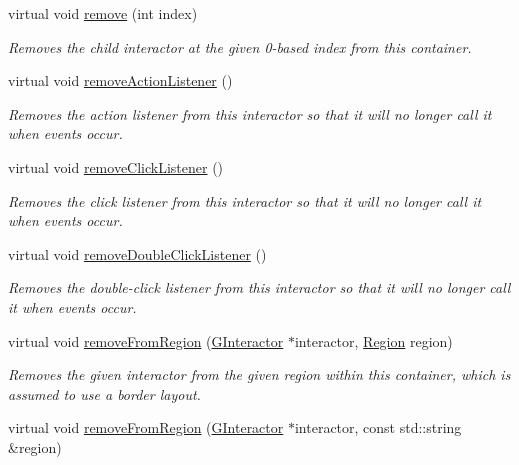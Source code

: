 \begin{DoxyCompactItemize}
virtual void \mbox{\hyperlink{classsgl_1_1GContainer_a2ad1aa316f278b2e9fa8121504749652}{remove}} (int index)
\begin{DoxyCompactList}\small\item\em Removes the child interactor at the given 0-\/based index from this container. \end{DoxyCompactList}\item 
virtual void \mbox{\hyperlink{classsgl_1_1GInteractor_ab7fe7a876367b87cf7202f947f1d05e4}{remove\+Action\+Listener}} ()
\begin{DoxyCompactList}\small\item\em Removes the action listener from this interactor so that it will no longer call it when events occur. \end{DoxyCompactList}\item 
virtual void \mbox{\hyperlink{classsgl_1_1GInteractor_ad39d0325cde6b97ebda4b9d7787c633b}{remove\+Click\+Listener}} ()
\begin{DoxyCompactList}\small\item\em Removes the click listener from this interactor so that it will no longer call it when events occur. \end{DoxyCompactList}\item 
virtual void \mbox{\hyperlink{classsgl_1_1GInteractor_aa4250907e4cdd77349c04f0cf5cdd3d3}{remove\+Double\+Click\+Listener}} ()
\begin{DoxyCompactList}\small\item\em Removes the double-\/click listener from this interactor so that it will no longer call it when events occur. \end{DoxyCompactList}\item 
virtual void \mbox{\hyperlink{classsgl_1_1GContainer_a87a74b040025878283ba685e30d5104f}{remove\+From\+Region}} (\mbox{\hyperlink{classsgl_1_1GInteractor}{G\+Interactor}} $\ast$interactor, \mbox{\hyperlink{classsgl_1_1GContainer_a81a01a86de31071a92e6cce0bab9bc4b}{Region}} region)
\begin{DoxyCompactList}\small\item\em Removes the given interactor from the given region within this container, which is assumed to use a border layout. \end{DoxyCompactList}\item 
virtual void \mbox{\hyperlink{classsgl_1_1GContainer_a16268c8344a5a5d9b10bde95764112d1}{remove\+From\+Region}} (\mbox{\hyperlink{classsgl_1_1GInteractor}{G\+Interactor}} $\ast$interactor, const std\+::string \&region)

\end{DoxyCompactItemize}
